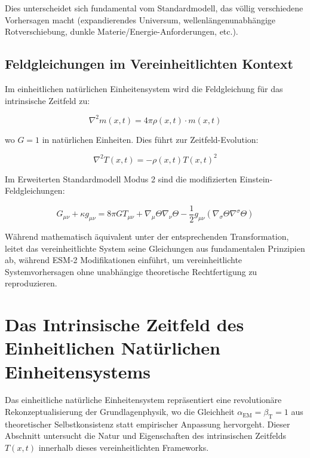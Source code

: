 \documentclass[12pt,a4paper]{article}
\newcommand{\Tfieldt}{T(x,t)}
\newcommand{\alphaEM}{\alpha_{\text{EM}}}
\newcommand{\betaT}{\beta_{\text{T}}}
\begin{document}
	Dies unterscheidet sich fundamental vom Standardmodell, das völlig verschiedene Vorhersagen macht (expandierendes Universum, wellenlängenunabhängige Rotverschiebung, dunkle Materie/Energie-Anforderungen, etc.).
	
	\subsection{Feldgleichungen im Vereinheitlichten Kontext}
	\label{subsec:field_equations_unified}
	
	Im einheitlichen natürlichen Einheitensystem wird die Feldgleichung für das intrinsische Zeitfeld zu:
	
	\begin{equation}
		\nabla^2 m(x,t) = 4\pi \rho(x,t) \cdot m(x,t)
	\end{equation}
	
	wo $G = 1$ in natürlichen Einheiten. Dies führt zur Zeitfeld-Evolution:
	
	\begin{equation}
		\nabla^2 \Tfieldt = -\rho(x,t) \Tfieldt^2
	\end{equation}
	
	Im Erweiterten Standardmodell Modus 2 sind die modifizierten Einstein-Feldgleichungen:
	
	\begin{equation}
		G_{\mu\nu} + \kappa g_{\mu\nu} = 8\pi G T_{\mu\nu} + \nabla_{\mu}\Theta\nabla_{\nu}\Theta - \frac{1}{2}g_{\mu\nu}(\nabla_{\sigma}\Theta\nabla^{\sigma}\Theta)
	\end{equation}
	
	Während mathematisch äquivalent unter der entsprechenden Transformation, leitet das vereinheitlichte System seine Gleichungen aus fundamentalen Prinzipien ab, während ESM-2 Modifikationen einführt, um vereinheitlichte Systemvorhersagen ohne unabhängige theoretische Rechtfertigung zu reproduzieren.
	
	\section{Das Intrinsische Zeitfeld des Einheitlichen Natürlichen Einheitensystems}
	\label{sec:unified_time_field}
	
	Das einheitliche natürliche Einheitensystem repräsentiert eine revolutionäre Rekonzeptualisierung der Grundlagenphysik, wo die Gleichheit $\alphaEM = \betaT = 1$ aus theoretischer Selbstkonsistenz statt empirischer Anpassung hervorgeht. Dieser Abschnitt untersucht die Natur und Eigenschaften des intrinsischen Zeitfelds $\Tfieldt$ innerhalb dieses vereinheitlichten Frameworks.
	
\end{document}
